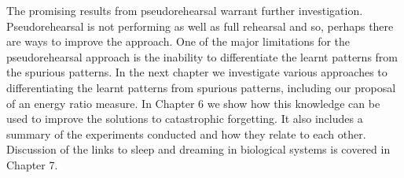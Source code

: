 The promising results from pseudorehearsal warrant further investigation.  Pseudorehearsal is not performing as well as full rehearsal and so, perhaps there are ways to improve the approach.  One of the major limitations for the pseudorehearsal approach is the inability to differentiate the learnt patterns from the spurious patterns. In the next chapter we investigate various approaches to differentiating the learnt patterns from spurious patterns, including our proposal of an energy ratio measure.  In Chapter 6 we show how this knowledge can be used to improve the solutions to catastrophic forgetting.  It also includes a summary of the experiments conducted and how they relate to each other. Discussion of the links to sleep and dreaming in biological systems is covered in Chapter 7. 

